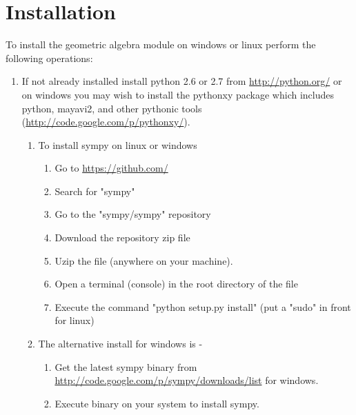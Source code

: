 \documentclass[10pt]{article}
\begin{document}
\section{Installation}

To install the geometric algebra module on windows or linux perform the following operations:

	\begin{enumerate}
    \item If not already installed install python 2.6 or 2.7 from \url{http://python.org/} or on windows
       you may wish to install the pythonxy package which includes python, mayavi2, and other pythonic
       tools (\url{http://code.google.com/p/pythonxy/}).
	   \begin{enumerate}
       \item To install sympy on linux or windows
          \begin{enumerate}
           \item Go to \url{https://github.com/}
           \item Search for "sympy"
           \item Go to the "sympy/sympy" repository
           \item Download the repository zip file
           \item Uzip the file (anywhere on your machine).
           \item Open a terminal (console) in the root directory of the file
           \item Execute the command "python setup.py install" (put a "sudo" in front for linux)          
          \end{enumerate}
        \item The alternative install for windows is -
          \begin{enumerate}
           \item Get the latest sympy binary from \url{http://code.google.com/p/sympy/downloads/list} for windows.
           \item Execute binary on your system to install sympy.	 
           \end{enumerate}  
	   \end{enumerate}


\end{enumerate}
\end{document}
